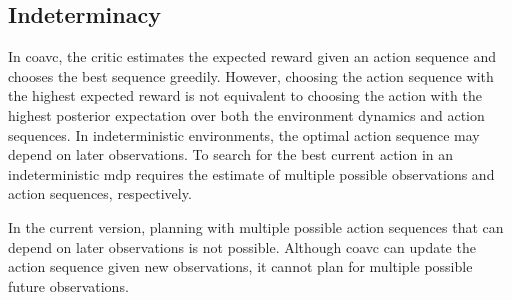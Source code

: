 \subsection{Indeterminacy}
In \ac{coavc}, the critic estimates the expected reward given an action sequence and chooses the best sequence greedily. 
However, choosing the action sequence with the highest expected reward is not equivalent to choosing the action with the highest posterior 
expectation over both the environment dynamics and action sequences. In indeterministic environments, the optimal action sequence may depend on later observations. To 
search for the best current action in an indeterministic \ac{mdp} requires the estimate of multiple possible observations and action sequences, respectively.

In the current version, planning with multiple possible action sequences that can depend on later observations is not possible. 
Although \ac{coavc} can update the action sequence given new observations, it cannot plan for multiple possible future observations.